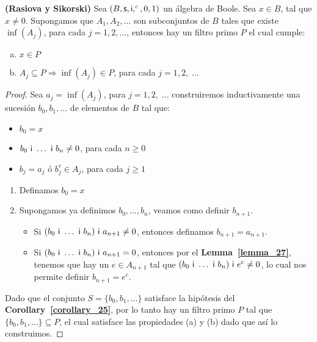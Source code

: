   \begin{theorem} \label{theorem_28}
    \PN \textbf{(Rasiova y Sikorski)} Sea $(B, \mathsf{s}, \mathsf{i}, ^{c}, 0, 1)$ un álgebra de Boole. Sea $x \in B$, tal que $x \neq 0$. Supongamos
    que $A_{1}, A_{2}, \dotsc$ son subconjuntos de $B$ tales que existe $\inf(A_{j})$, para cada $j = 1, 2, \dotsc$,
    entonces hay un filtro primo $P$ el cual cumple:
    \begin{enumerate}[a)]
      \item $x \in P$
      \item $A_{j} \subseteq P \Rightarrow \inf(A_{j}) \in P$, para cada $j = 1, 2, \; \dotsc$
    \end{enumerate}
  \end{theorem}
  \begin{proof}
    \PN Sea $a_{j} = \inf(A_{j})$, para $j = 1, 2, \; \dotsc $ construiremos inductivamente una sucesión $b_{0},
    b_{1}, \dotsc$ de elementos de $B$ tal que:
    \begin{itemize}
      \item $b_{0} = x$
      \item $b_{0} \ \mathsf{i} \ \dotsc \ \mathsf{i} \ b_{n} \neq 0$, para cada $n \geq 0$
      \item $b_{j} = a_{j}$ ó $b_{j}^{c} \in A_{j}$, para cada $j \geq 1$
    \end{itemize}
    \begin{enumerate}[(1)]
      \item Definamos $b_{0} = x$
      \item Supongamos ya definimos $b_{0}, \dotsc, b_{n}$, veamos como definir $b_{n+1}$.
        \begin{itemize}
          \item Si $(b_{0} \ \mathsf{i} \ \dotsc \ \mathsf{i} \  b_{n}) \ \mathsf{i} \ a_{n+1}\neq 0$, entonces definamos $b_{n+1} = a_{n+1}$.
          \item Si $(b_{0} \ \IN \ \dotsc \ \IN \ b_{n}) \ \IN \ a_{n+1}=0$, entonces por el
            \textbf{Lemma~\ref{lemma_27}}, tenemos que hay un $e \in A_{n+1}$ tal que $(b_{0} \ \mathsf{i} \ \dotsc \ \mathsf{i} \
            b_{n}) \ \mathsf{i} \ e^{c}\neq 0$, lo cual nos permite definir $b_{n+1} = e^{c}$.
        \end{itemize}
    \end{enumerate}

    \PN Dado que el conjunto $S = \{b_{0}, b_{1}, \dotsc\}$ satisface la hipótesis del
    \textbf{Corollary~\ref{corollary_25}}, por lo tanto hay un filtro primo $P$ tal que $\{b_{0}, b_{1}, \dotsc\}
    \subseteq P$, el cual satisface las propiedades (a) y (b) dado que así lo construimos.
  \end{proof}
